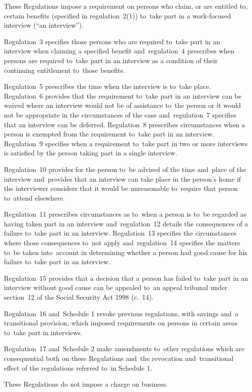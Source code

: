 \documentclass[12pt,a4paper]{article}
\begin{document}
These Regulations impose a requirement on persons who claim, or are entitled to, certain benefits (specified in regulation~2(1)) to~take part in a work-focused interview (“an interview”).

Regulation~3 specifies those persons who are required to~take part in an interview when claiming a specified benefit and~regulation~4 prescribes when persons are required to~take part in an interview as a condition of their continuing entitlement to~those benefits.

Regulation~5 prescribes the time when the interview is to~take place. Regulation~6 provides that the requirement to~take part in an interview can be waived where an interview would not be of assistance to~the person or it would not be appropriate in the circumstances of the case and~regulation~7 specifies that an interview can be deferred. Regulation~8 prescribes circumstances when a person is exempted from the requirement to~take part in an interview. Regulation~9 specifies when a requirement to~take part in two or more interviews is satisfied by the person taking part in a single interview.

Regulation~10 provides for the person to~be advised of the time and~place of the interview and~provides that an interview can take place in the person’s home if the interviewer considers that it would be unreasonable to~require that person to~attend elsewhere.

Regulation~11 prescribes circumstances as to~when a person is to~be regarded as having taken part in an interview and~regulation~12 details the consequences of a failure to~take part in an interview. Regulation~13 specifies the circumstances where those consequences to~not apply and~regulation~14 specifies the matters to~be taken into~account in determining whether a person had good cause for his failure to~take part in an interview.

Regulation~15 provides that a decision that a person has failed to~take part in an interview without good cause can be appealed to~an appeal tribunal under section~12 of the Social Security Act 1998 (c.~14).

Regulation~16 and~Schedule 1 revoke previous regulations, with savings and~a transitional provision, which imposed requirements on persons in certain areas to~take part in interviews.

Regulation~17 and~Schedule 2 make amendments to~other regulations which are consequential both on these Regulations and~the revocation and~transitional effect of the regulations referred to~in Schedule 1.

These Regulations do not impose a charge on business. 
\end{document}
